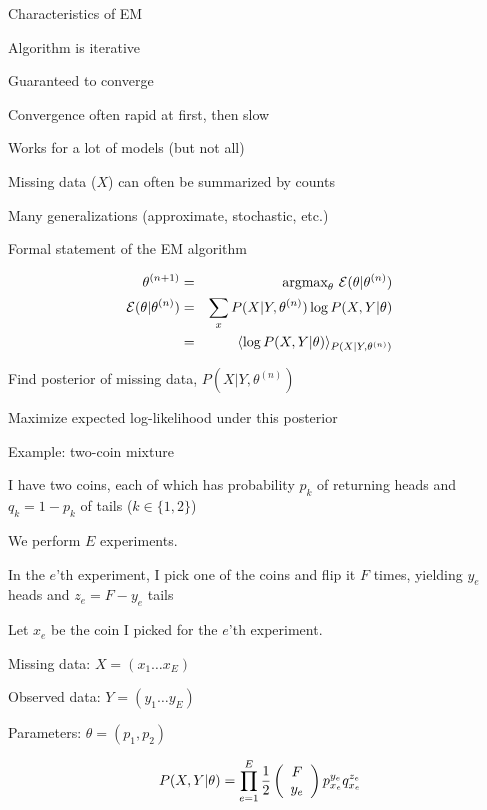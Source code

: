 \documentclass{beamer}
\begin{document}
\begin{frame}{Characteristics of EM}

\itemb
\item Algorithm is \alert{iterative}
 \itemb
 \item Guaranteed to converge
 \item Convergence often rapid at first, then slow
 \iteme
\item Works for a lot of models (but not all)
\item Missing data ($X$) can often be summarized by \alert{counts}
\item Many generalizations (approximate, stochastic, etc.)
\iteme

\end{frame}


\begin{frame}{Formal statement of the EM algorithm}

\begin{eqnarray*}
\theta^{(n+1)} & = & \mbox{argmax}_{\theta}\ {\cal E}(\theta|\theta^{(n)}) \\
{\cal E}(\theta|\theta^{(n)}) & = & \sum_x P(X|Y,\theta^{(n)}) \log P(X,Y|\theta) \\
& = & \langle \log P(X,Y|\theta) \rangle_{P(X|Y,\theta^{(n)})}
\end{eqnarray*}

\itemb
\item Find posterior of missing data, $P(X|Y,\theta^{(n)})$
\item Maximize expected log-likelihood under this posterior
\iteme

\end{frame}



\begin{frame}{Example: two-coin mixture}

\itemb
\item I have two coins, each of which has probability $p_k$ of returning heads and $q_k=1-p_k$ of tails ($k \in \{ 1,2 \}$)
\item We perform $E$ experiments.
\item In the $e$'th experiment, I pick one of the coins and flip it $F$ times, yielding $y_e$ heads and $z_e = F - y_e$ tails
\item Let $x_e$ be the coin I picked for the $e$'th experiment.
\item Missing data: $X = (x_1 \ldots x_E)$
\item Observed data: $Y = (y_1 \ldots y_E)$
\item Parameters: $\theta = (p_1, p_2)$
\iteme

\[
P(X,Y|\theta) = \prod_{e=1}^E \frac{1}{2} \left( \begin{array}{c} F \\ y_e \end{array} \right) p_{x_e}^{y_e} q_{x_e}^{z_e}
\]

\end{frame}
\end{document}
